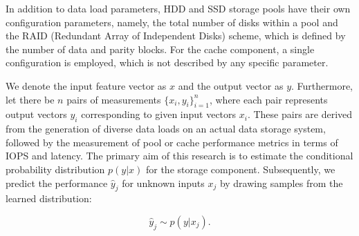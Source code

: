     In addition to data load parameters, HDD and SSD storage pools have their own configuration parameters, namely, the total number of disks within a pool and the RAID (Redundant Array of Independent Disks) scheme, which is defined by the number of data and parity blocks. For the cache component, a single configuration is employed, which is not described by any specific parameter. 
    
    
    We denote the input feature vector as $x$ and the output vector as $y$. Furthermore, let there be $n$ pairs of measurements $\{x_i, y_i\}_{i=1}^{n}$, where each pair represents output vectors $y_i$ corresponding to given input vectors $x_i$. These pairs are derived from the generation of diverse data loads on an actual data storage system, followed by the measurement of pool or cache performance metrics in terms of IOPS and latency. The primary aim of this research is to estimate the conditional probability distribution $p(y|x)$ for the storage component. Subsequently, we predict the performance $\hat{y}_j$ for unknown inputs $x_j$ by drawing samples from the learned distribution:
    
    \begin{equation}
    \hat{y}_j \sim p(y|x_j).
    \end{equation}
    
